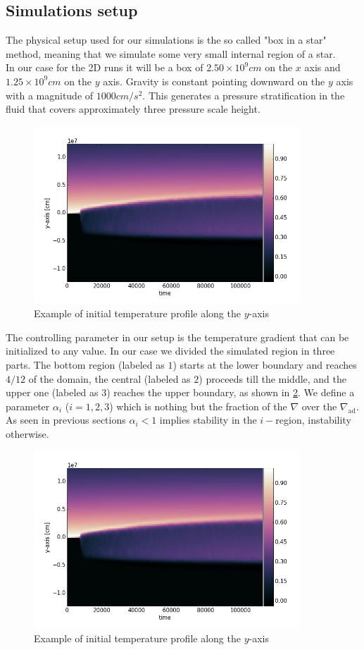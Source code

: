 \subsection{Simulations setup}
The physical setup used for our simulations is the so called "box in a star" method, meaning that we simulate some very small internal region of a star. \\
In our case for the 2D runs it will be a box of $2.50 \times 10^{9} cm$ on the $x$ axis and $1.25 \times 10^{9} cm$ on the $y$ axis. Gravity is constant pointing downward on the $y$ axis with a magnitude of $1000 cm/s^2$. This generates a pressure stratification in the fluid that covers approximately three pressure scale height. \\
\begin{figure}[t]
\includegraphics[width=10cm]{./img/tempprofile}
\caption{Example of initial temperature profile along the $y$-axis}
\label{fig:tempprofile}
\centering
\end{figure}
The controlling parameter in our setup is the temperature gradient that can be initialized to any value. In our case we divided the simulated region in three parts. The bottom region (labeled as $1$) starts at the lower boundary and reaches $4/12$ of the domain, the central (labeled as $2$) proceeds till the middle, and the upper one (labeled as $3$) reaches the upper boundary, as shown in \ref{fig:tempprofile}. We define a parameter $\alpha_{i}$ ($i=1, 2, 3$) which is nothing but the fraction of the $\nabla$ over the $\nabla_{\mathrm{ad}}$. As seen in previous sections $\alpha_{i}<1$ implies stability in the $i-$region, instability otherwise. \\
\begin{figure}[t]
\includegraphics[width=10cm]{./img/tempprofile}
\caption{Example of initial temperature profile along the $y$-axis}
\label{fig:tempprofile}
\centering
\end{figure}
